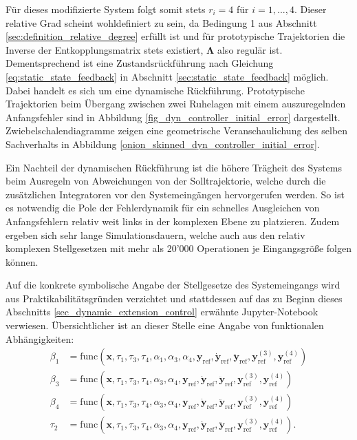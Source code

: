 Für dieses modifizierte System folgt somit stets $r_i = 4$ für $i = 1, ..., 4$. Dieser relative Grad scheint wohldefiniert zu sein, da Bedingung 1 aus Abschnitt \ref{sec:definition_relative_degree} erfüllt ist und für prototypische Trajektorien die Inverse der Entkopplungsmatrix stets existiert, $\boldsymbol{\Lambda}$ also regulär ist. Dementsprechend ist eine Zustandsrückführung nach Gleichung \eqref{eq:static_state_feedback} in Abschnitt \ref{sec:static_state_feedback} möglich. Dabei handelt es sich um eine dynamische Rückführung. Prototypische Trajektorien beim Übergang zwischen zwei Ruhelagen mit einem auszuregelnden Anfangsfehler sind in Abbildung \ref{fig_dyn_controller_initial_error} dargestellt. Zwiebelschalendiagramme zeigen eine geometrische Veranschaulichung des selben Sachverhalts in Abbildung \ref{onion_skinned_dyn_controller_initial_error}.

Ein Nachteil der dynamischen Rückführung ist die höhere Trägheit des Systems beim Ausregeln von Abweichungen von der Solltrajektorie, welche durch die zusätzlichen Integratoren vor den Systemeingängen hervorgerufen werden. So ist es notwendig die Pole der Fehlerdynamik für ein schnelles Ausgleichen von Anfangsfehlern relativ weit links in der komplexen Ebene zu platzieren. Zudem ergeben sich sehr lange Simulationsdauern, welche auch aus den relativ komplexen Stellgesetzen mit mehr als 20'000 Operationen je Eingangsgröße folgen können. 

Auf die konkrete symbolische Angabe der Stellgesetze des Systemeingangs wird aus Praktikabilitätsgründen verzichtet und stattdessen auf das zu Beginn dieses Abschnitts \ref{sec_dynamic_extension_control} erwähnte Jupyter-Notebook verwiesen. Übersichtlicher ist an dieser Stelle eine Angabe von funktionalen Abhängigkeiten:
\begin{subequations}
	\begin{align}
		\beta_1 &= \mathrm{func}(\mathbf{x}, \tau_1, \tau_3, \tau_4, \alpha_1, \alpha_3, \alpha_4, \mathbf{y}_{\mathrm{ref}}, \dot{\mathbf{y}}_{\mathrm{ref}}, \ddot{\mathbf{y}}_{\mathrm{ref}}, \mathbf{y}_{\mathrm{ref}}^{(3)}, \mathbf{y}_{\mathrm{ref}}^{(4)}) \\
		\beta_3 &= \mathrm{func}(\mathbf{x}, \tau_1, \tau_3, \tau_4, \alpha_3, \alpha_4, \mathbf{y}_{\mathrm{ref}}, \dot{\mathbf{y}}_{\mathrm{ref}}, \ddot{\mathbf{y}}_{\mathrm{ref}}, \mathbf{y}_{\mathrm{ref}}^{(3)}, \mathbf{y}_{\mathrm{ref}}^{(4)}) \\
		\beta_4 &= \mathrm{func}(\mathbf{x}, \tau_1, \tau_3, \tau_4, \alpha_3, \alpha_4, \mathbf{y}_{\mathrm{ref}}, \dot{\mathbf{y}}_{\mathrm{ref}}, \ddot{\mathbf{y}}_{\mathrm{ref}}, \mathbf{y}_{\mathrm{ref}}^{(3)}, \mathbf{y}_{\mathrm{ref}}^{(4)}) \\
		\tau_2 &= \mathrm{func}(\mathbf{x}, \tau_1, \tau_3, \tau_4, \alpha_3, \alpha_4, \mathbf{y}_{\mathrm{ref}}, \dot{\mathbf{y}}_{\mathrm{ref}}, \ddot{\mathbf{y}}_{\mathrm{ref}}, \mathbf{y}_{\mathrm{ref}}^{(3)}, \mathbf{y}_{\mathrm{ref}}^{(4)}).
	\end{align}
\end{subequations}


